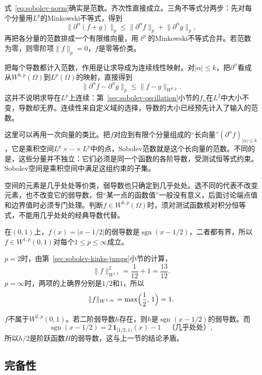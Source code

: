 式~\eqref{eq:sobolev-norm}确实是范数。齐次性直接成立。三角不等式分两步：先对每个分量用$L^p$的Minkowski不等式，得到
\[
\lVert\partial^\alpha(f+g)\rVert_p\leq\lVert\partial^\alpha f\rVert_p+\lVert\partial^\alpha g\rVert_p,
\]
再把各分量的范数排成一个有限维向量，用$\ell^p$的Minkowski不等式合并。若范数为零，则零阶项$\lVert f\rVert_p=0$，$f$是零等价类。

把每个导数都计入范数，作用是让求导成为连续线性映射。对$|\alpha|\leq k$，把$\partial^\alpha$看成从$W^{k,p}(\Omega)$到$L^p(\Omega)$的映射，直接得到
\begin{equation}
\lVert\partial^\alpha f-\partial^\alpha g\rVert_p\leq\lVert f-g\rVert_{W^{k,p}} .
\label{eq:sobolev-derivative-continuous}
\end{equation}
这并不说明求导在$L^p$上连续：第~\ref{sec:sobolev-oscillation}小节的$f_n$在$L^2$中大小不变，导数却无界。连续性来自定义域的选择，导数的大小已经预先计入了输入的范数。

这里可以再用一次向量的类比。把$f$对应到有限个分量组成的“长向量”$(\partial^\alpha f)_{|\alpha|\leq k}$，它是乘积空间$L^p\times\cdots\times L^p$中的点，Sobolev范数就是这个长向量的范数。不同的是，这些分量并不独立：它们必须是同一个函数的各阶导数，受测试恒等式约束。Sobolev空间是乘积空间中满足这组约束的子集。

空间的元素是几乎处处等价类，弱导数也只确定到几乎处处。选不同的代表不改变元素，也不改变它的弱导数，但“某一点的函数值”一般没有意义，后面讨论端点值和边界值时必须专门处理。判断$f\in W^{k,p}(\Omega)$时，须对测试函数核对积分恒等式，不能用几乎处处的经典导数代替。

\begin{example}[折点函数的Sobolev范数]
\label{ex:sobolev-kink-norm}
在$(0,1)$上，$f(x)=|x-1/2|$的弱导数是$\operatorname{sgn}(x-1/2)$，二者都有界，所以$f\in W^{1,p}(0,1)$对每个$1\leq p\leq\infty$成立。

$p=2$时，由第~\ref{sec:sobolev-kinks-jumps}小节的计算，
\[
\lVert f\rVert_{W^{1,2}}^2=\frac1{12}+1=\frac{13}{12}.
\]
$p=\infty$时，两项的上确界分别是$1/2$和$1$，所以
\[
\lVert f\rVert_{W^{1,\infty}}=\max\Bigl(\frac12,\,1\Bigr)=1.
\]

$f$不属于$W^{2,p}(0,1)$。若二阶弱导数$h$存在，则$h$是$\operatorname{sgn}(x-1/2)$的弱导数。而
\[
\operatorname{sgn}(x-1/2)=2\,\mathbf 1_{[1/2,1)}(x)-1\quad\text{（几乎处处）},
\]
所以$h/2$是阶跃函数$H$的弱导数，这与上一节的结论矛盾。
\end{example}

\subsection{完备性}
\label{sec:sobolev-completeness}

